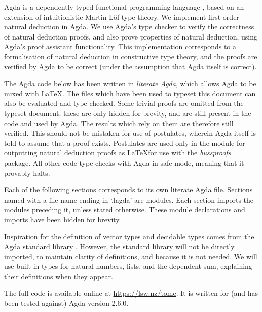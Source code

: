 Agda \citep{agdawiki} is a dependently-typed functional programming language
\citep{norellthesis}, based on an extension of intuitionistic Martin-L{\"o}f
type theory. We implement first order natural deduction in Agda. We use Agda's
type checker to verify the correctness of natural deduction proofs, and also
prove properties of natural deduction, using Agda's proof assistant
functionality.  This implementation corresponds to a formalisation of natural
deduction in constructive type theory, and the proofs are verified by Agda to be
correct (under the assumption that Agda itself is correct).

The Agda code below has been written in \emph{literate Agda}, which allows Agda
to be mixed with \LaTeX. The files which have been used to typeset this document
can also be evaluated and type checked. Some trivial proofs are omitted from the
typeset document; these are only hidden for brevity, and are still present in
the code and used by Agda. The results which rely on them are therefore still
verified. This should not be mistaken for use of postulates, wherein Agda itself
is told to assume that a proof exists. Postulates are used only in the module
for outputting natural deduction proofs as \LaTeX for use with the
\emph{bussproofs} package. All other code type checks with Agda in safe mode,
meaning that it provably halts.

Each of the following sections corresponds to its own literate Agda file.
Sections named with a file name ending in `.lagda' are modules. Each section
imports the modules preceding it, unless stated otherwise. These module
declarations and imports have been hidden for brevity.

Inspiration for the definition of vector types and decidable types comes from
the Agda standard library \citep{agdastdlib}. However, the standard library will
not be directly imported, to maintain clarity of definitions, and because it is
not needed. We will use built-in types for natural numbers, lists, and the
dependent sum, explaining their definitions when they appear.

The full code is available online at {\small \url{https://lsw.nz/tome}}. It is
written for (and has been tested against) Agda version 2.6.0.
